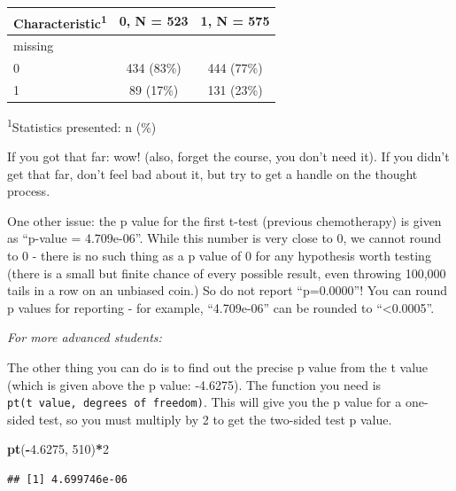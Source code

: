 \documentclass[]{book}
\newenvironment{Shaded}{\begin{snugshade}}{\end{snugshade}}
\newcommand{\DecValTok}[1]{\textcolor[rgb]{0.00,0.00,0.81}{#1}}
\newcommand{\FloatTok}[1]{\textcolor[rgb]{0.00,0.00,0.81}{#1}}
\newcommand{\KeywordTok}[1]{\textcolor[rgb]{0.13,0.29,0.53}{\textbf{#1}}}
\newcommand{\NormalTok}[1]{#1}
\newcommand{\OperatorTok}[1]{\textcolor[rgb]{0.81,0.36,0.00}{\textbf{#1}}}
\begin{document}
\captionsetup[table]{labelformat=empty,skip=1pt}
\begin{longtable}{lcc}
\toprule
\textbf{Characteristic}\textsuperscript{1} & \textbf{0}, N = 523 & \textbf{1}, N = 575 \\ 
\midrule
missing &  &  \\ 
0 & 434 (83\%) & 444 (77\%) \\ 
1 & 89 (17\%) & 131 (23\%) \\ 
\bottomrule
\end{longtable}
\vspace{-5mm}
\begin{minipage}{\linewidth}
\textsuperscript{1}Statistics presented: n (\%) \\ 
\end{minipage}

If you got that far: wow! (also, forget the course, you don't need it). If you didn't get that far, don't feel bad about it, but try to get a handle on the thought process.

One other issue: the p value for the first t-test (previous chemotherapy) is given as ``p-value = 4.709e-06''. While this number is very close to 0, we cannot round to 0 - there is no such thing as a p value of 0 for any hypothesis worth testing (there is a small but finite chance of every possible result, even throwing 100,000 tails in a row on an unbiased coin.) So do not report ``p=0.0000''! You can round p values for reporting - for example, ``4.709e-06'' can be rounded to ``\textless0.0005''.

\emph{For more advanced students:}

The other thing you can do is to find out the precise p value from the t value (which is given above the p value: -4.6275). The function you need is \texttt{pt(t\ value,\ degrees\ of\ freedom)}. This will give you the p value for a one-sided test, so you must multiply by 2 to get the two-sided test p value.

\begin{Shaded}
\begin{Highlighting}[]
\KeywordTok{pt}\NormalTok{(}\OperatorTok{-}\FloatTok{4.6275}\NormalTok{, }\DecValTok{510}\NormalTok{)}\OperatorTok{*}\DecValTok{2}
\end{Highlighting}
\end{Shaded}

\begin{verbatim}
## [1] 4.699746e-06
\end{verbatim}
\end{document}
